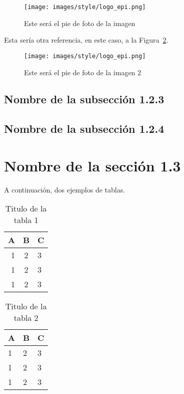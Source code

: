 \begin{figure}
    \centering
    \texttt{[image: images/style/logo\_epi.png]}
    \caption{Este será el pie de foto de la imagen}
    \label{fig:fig1}
\end{figure}

Esta sería otra referencia, en este caso, a la Figura~\ref{fig:fig2}.

\begin{figure}
    \centering
    \texttt{[image: images/style/logo\_epi.png]}
    \caption{Este será el pie de foto de la imagen 2}
    \label{fig:fig2}
\end{figure}

\subsection{Nombre de la subsección 1.2.3}

\lipsum[3-6]

\subsection{Nombre de la subsección 1.2.4}

\lipsum[3-6]

\section{Nombre de la sección 1.3}

A continuación, dos ejemplos de tablas.

\begin{table}
    \centering
    \begin{tabular}{rcl}
        \hline \hline
            A & B & C \\ \hline
         1 & 2 & 3 \\
         1 & 2 & 3 \\
         1 & 2 & 3 \\
        \hline \hline
    \end{tabular}
    \caption{Titulo de la tabla 1}
    \label{tab:tab1}
\end{table}

\begin{table}
    \centering
    \begin{tabular}{lll}
        \hline \hline
            A & B & C \\ \hline
         1 & 2 & 3 \\
         1 & 2 & 3 \\
         1 & 2 & 3 \\
        \hline \hline
    \end{tabular}
    \caption{Titulo de la tabla 2}
    \label{tab:tab2}
\end{table}

